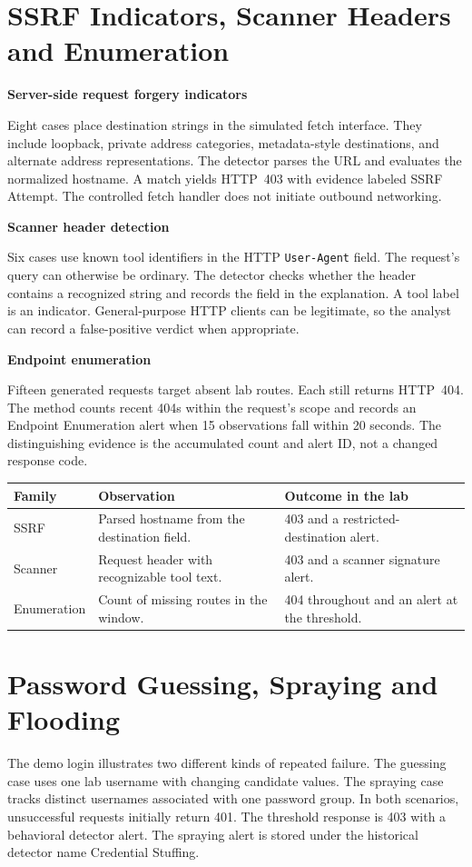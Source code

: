 \documentclass[11pt,a4paper,oneside]{report}
\newcommand{\topic}[1]{\smallskip\noindent\textbf{#1}\par\nobreak\vspace{-.39em}}
\newcommand{\sheet}[1]{\clearpage\section{#1}}
\newcommand{\tabletitle}[1]{\captionof{table}{#1}\smallskip}
\begin{document}
\sheet{SSRF Indicators, Scanner Headers and Enumeration}
\topic{Server-side request forgery indicators}
Eight cases place destination strings in the simulated fetch interface. They include loopback, private address categories, metadata-style destinations, and alternate address representations. The detector parses the URL and evaluates the normalized hostname. A match yields HTTP~403 with evidence labeled SSRF Attempt. The controlled fetch handler does not initiate outbound networking.

\topic{Scanner header detection}
Six cases use known tool identifiers in the HTTP \texttt{User-Agent} field. The request's query can otherwise be ordinary. The detector checks whether the header contains a recognized string and records the field in the explanation. A tool label is an indicator. General-purpose HTTP clients can be legitimate, so the analyst can record a false-positive verdict when appropriate.

\topic{Endpoint enumeration}
Fifteen generated requests target absent lab routes. Each still returns HTTP~404. The method counts recent 404s within the request's scope and records an Endpoint Enumeration alert when 15 observations fall within 20 seconds. The distinguishing evidence is the accumulated count and alert ID, not a changed response code.

\tabletitle{What each family observes and decides}
\begin{tabularx}{\linewidth}{@{}p{.21\linewidth}YY@{}}\toprule
\textbf{Family} & \textbf{Observation} & \textbf{Outcome in the lab}\\\midrule
SSRF & Parsed hostname from the destination field. & 403 and a restricted-destination alert.\\
Scanner & Request header with recognizable tool text. & 403 and a scanner signature alert.\\
Enumeration & Count of missing routes in the window. & 404 throughout and an alert at the threshold.\\
\bottomrule\end{tabularx}

\sheet{Password Guessing, Spraying and Flooding}
The demo login illustrates two different kinds of repeated failure. The guessing case uses one lab username with changing candidate values. The spraying case tracks distinct usernames associated with one password group. In both scenarios, unsuccessful requests initially return 401. The threshold response is 403 with a behavioral detector alert. The spraying alert is stored under the historical detector name Credential Stuffing.
\end{document}
